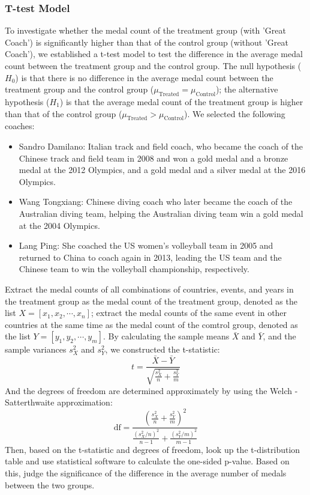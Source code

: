 \documentclass{mcmthesis}  %
\begin{document}
\subsubsection{T-test Model}

\hspace*{1.5em}To investigate whether the medal count of the treatment group (with 'Great Coach') is significantly higher than that of the control group (without 'Great Coach'), we established a t-test model to test the difference in the average medal count between the treatment group and the control group. The null hypothesis ($H_0$) is that there is no difference in the average medal count between the treatment group and the control group (\(\mu_{\text{Treated}} = \mu_{\text{Control}}\)); the alternative hypothesis ($H_1$) is that the average medal count of the treatment group is higher than that of the control group (\(\mu_{\text{Treated}} > \mu_{\text{Control}}\)). We selected the following coaches:
\begin{itemize}  %
\item Sandro Damilano: Italian track and field coach, who became the coach of the Chinese track and field team in 2008 and won a gold medal and a bronze medal at the 2012 Olympics, and a gold medal and a silver medal at the 2016 Olympics.
\item Wang Tongxiang: Chinese diving coach who later became the coach of the Australian diving team, helping the Australian diving team win a gold medal at the 2004 Olympics.
\item Lang Ping: She coached the US women's volleyball team in 2005 and returned to China to coach again in 2013, leading the US team and the Chinese team to win the volleyball championship, respectively.
\end{itemize}  %
\hspace*{1.5em}Extract the medal counts of all combinations of countries, events, and years in the treatment group as the medal count of the treatment group, denoted as the list \(X = [x_1, x_2, \cdots, x_n]\); extract the medal counts of the same event in other countries at the same time as the medal count of the comtrol group, denoted as the list \(Y = [y_1, y_2, \cdots, y_m]\). By calculating the sample means \(\bar{X}\) and \(\bar{Y}\), and the sample variances \(s_X^2\) and \(s_Y^2\), we constructed the t-statistic: \[t = \frac{\bar{X} - \bar{Y}}{\sqrt{\frac{s_X^2}{n} + \frac{s_Y^2}{m}}}\]
And the degrees of freedom are determined approximately by using the Welch - Satterthwaite approximation: \[ \text{df} = \frac{\left( \frac{s_X^2}{n} + \frac{s_Y^2}{m} \right)^2}{\frac{(s_X^2/n)^2}{n-1} + \frac{(s_Y^2/m)^2}{m-1}}
\]
\hspace*{1.5em}Then, based on the t-statistic and degrees of freedom, look up the t-distribution table and use statistical software to calculate the one-sided p-value. Based on this, judge the significance of the difference in the average number of medals between the two groups.
\end{document}

